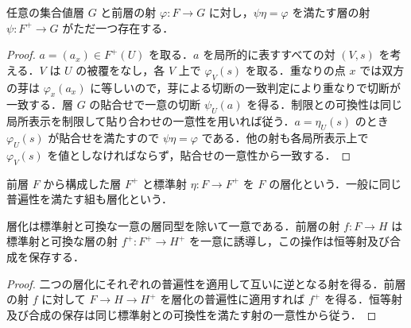 \begin{prop}[層化の普遍性]
任意の集合値層 $G$ と前層の射 $\varphi:F\to G$ に対し，$\psi\eta=\varphi$ を満たす層の射 $\psi:F^+\to G$ がただ一つ存在する．
\end{prop}
\begin{proof}
$a=(a_x)\in F^+(U)$ を取る．$a$ を局所的に表すすべての対 $(V,s)$ を考える．$V$ は $U$ の被覆をなし，各 $V$ 上で $\varphi_V(s)$ を取る．重なりの点 $x$ では双方の芽は $\varphi_x(a_x)$ に等しいので，芽による切断の一致判定により重なりで切断が一致する．層 $G$ の貼合せで一意の切断 $\psi_U(a)$ を得る．制限との可換性は同じ局所表示を制限して貼り合わせの一意性を用いれば従う．$a=\eta_U(s)$ のとき $\varphi_U(s)$ が貼合せを満たすので $\psi\eta=\varphi$ である．他の射も各局所表示上で $\varphi_V(s)$ を値としなければならず，貼合せの一意性から一致する．
\end{proof}
\begin{defn}[層化]
前層 $F$ から構成した層 $F^+$ と標準射 $\eta:F\to F^+$ を $F$ の層化という．一般に同じ普遍性を満たす組も層化という．
\end{defn}
\begin{prop}[層化の一意性と函手性]
層化は標準射と可換な一意の層同型を除いて一意である．前層の射 $f:F\to H$ は標準射と可換な層の射 $f^+:F^+\to H^+$ を一意に誘導し，この操作は恒等射及び合成を保存する．
\end{prop}
\begin{proof}
二つの層化にそれぞれの普遍性を適用して互いに逆となる射を得る．前層の射 $f$ に対して $F\to H\to H^+$ を層化の普遍性に適用すれば $f^+$ を得る．恒等射及び合成の保存は同じ標準射との可換性を満たす射の一意性から従う．
\end{proof}
